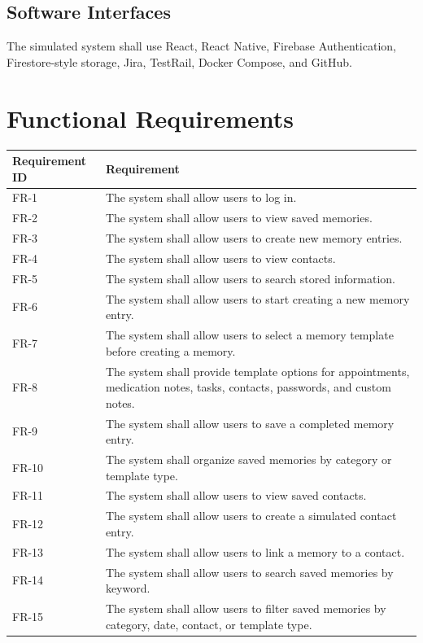 \documentclass{article}
\begin{document}
\subsection{Software Interfaces}
The simulated system shall use React, React Native, Firebase Authentication, Firestore-style storage, Jira, TestRail, Docker Compose, and GitHub.

\section{Functional Requirements}
\begin{longtable}{|p{3cm}|p{10cm}|}
\hline
Requirement ID & Requirement \\ \hline
FR-1 & The system shall allow users to log in. \\ \hline
FR-2 & The system shall allow users to view saved memories. \\ \hline
FR-3 & The system shall allow users to create new memory entries. \\ \hline
FR-4 & The system shall allow users to view contacts. \\ \hline
FR-5 & The system shall allow users to search stored information. \\ \hline
FR-6 & The system shall allow users to start creating a new memory entry. \\ \hline
FR-7 & The system shall allow users to select a memory template before creating a memory. \\ \hline
FR-8 & The system shall provide template options for appointments, medication notes, tasks, contacts, passwords, and custom notes. \\ \hline
FR-9 & The system shall allow users to save a completed memory entry. \\ \hline
FR-10 & The system shall organize saved memories by category or template type. \\ \hline
FR-11 & The system shall allow users to view saved contacts. \\ \hline
FR-12 & The system shall allow users to create a simulated contact entry. \\ \hline
FR-13 & The system shall allow users to link a memory to a contact. \\ \hline
FR-14 & The system shall allow users to search saved memories by keyword. \\ \hline
FR-15 & The system shall allow users to filter saved memories by category, date, contact, or template type. \\ \hline

\end{longtable}
\end{document}
